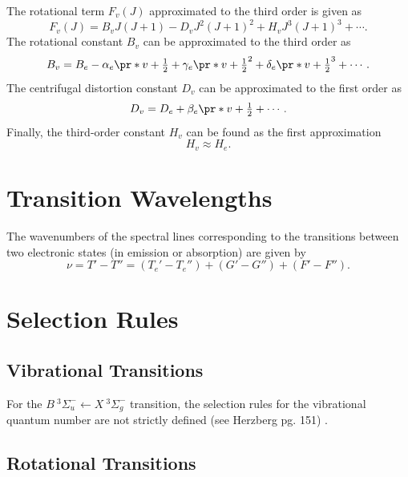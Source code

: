 \documentclass[11pt, twoside, fleqn]{report}
\begin{document}
The rotational term $F_v(J)$ approximated to the third order is given as
\begin{equation}
    F_v(J) = B_vJ(J + 1) - D_vJ^2(J + 1)^2 + H_vJ^3(J + 1)^3 + \dotsb.
\end{equation}
The rotational constant $B_v$ can be approximated to the third order as
\begin{equation*}
    B_v = B_e - \alpha_e\pr*{v + \tfrac{1}{2}} + \gamma_e\pr*{v + \tfrac{1}{2}}^2 + \delta_e\pr*{v + \tfrac{1}{2}}^3 + \dotsb.
\end{equation*}
The centrifugal distortion constant $D_v$ can be approximated to the first order as
\begin{equation}
    D_v = D_e + \beta_e\pr*{v + \tfrac{1}{2}} + \dotsb.
\end{equation}
Finally, the third-order constant $H_v$ can be found as the first approximation
\begin{equation}
    H_v \approx H_e.
\end{equation}

\section{Transition Wavelengths}
\label{s:transition_wavelengths}

The wavenumbers of the spectral lines corresponding to the transitions between two electronic states (in emission or absorption) are given by
\begin{equation}
    \nu = T' - T'' = (T_e' - T_e'') + (G' - G'') + (F' - F'').
\end{equation}

\section{Selection Rules}
\label{s:selection_rules}

\subsection{Vibrational Transitions}
\label{ss:vibrational_transitions}

For the $B~^3\Sigma_u^-\!\leftarrow\!X~^3\Sigma_g^-$ transition, the selection rules for the vibrational quantum number are not strictly defined (see Herzberg pg. 151) \cite{herzberg:spectra}.

\subsection{Rotational Transitions}
\label{ss:rotational_transitions}
\end{document}
